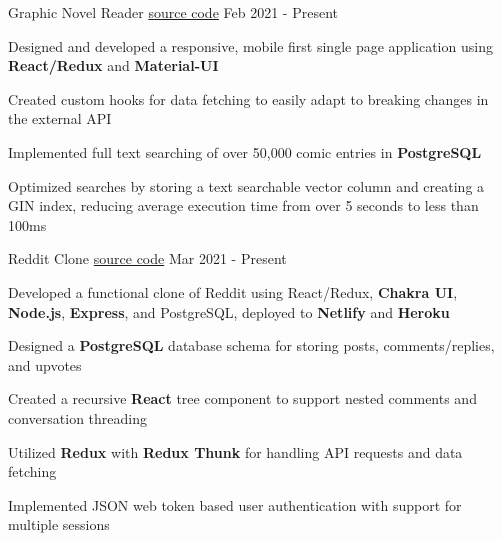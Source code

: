 
\begin{cventries}
  \cventry
    {\fontsize{10pt}{1em}\bodyfont\upshape\color{text}{Front-end comic reading client for the MangaDex API}} %
    {Graphic Novel Reader} %
    {\href{https://github.com/tacticaltofu/mangastack}{source code}} %
    {Feb 2021 - Present} %
    {
      \begin{cvitems} %
        \item {Designed and developed a responsive, mobile first single page application using \textbf{React/Redux} and \textbf{Material-UI}}
        \item {Created custom hooks for data fetching to easily adapt to breaking changes in the external API}
        \item {Implemented full text searching of over 50,000 comic entries in \textbf{PostgreSQL}}
        \item {Optimized searches by storing a text searchable vector column and creating a GIN index, reducing average execution time from over 5 seconds to less than 100ms}
      \end{cvitems}
    }
  \cventry
    {\fontsize{10pt}{1em}\bodyfont\upshape\color{text}{Social news and discussion website very similar to Reddit}} %
    {Reddit Clone} %
    {\href{https://github.com/tacticaltofu/reddit-clone}{source code}} %
    {Mar 2021 - Present} %
    {
      \begin{cvitems} %
        \item {Developed a functional clone of Reddit using React/Redux, \textbf{Chakra UI}, \textbf{Node.js}, \textbf{Express}, and PostgreSQL, deployed to \textbf{Netlify} and \textbf{Heroku}}
        \item {Designed a \textbf{PostgreSQL} database schema for storing posts, comments/replies, and upvotes}
        \item {Created a recursive \textbf{React} tree component to support nested comments and conversation threading}
        \item {Utilized \textbf{Redux} with \textbf{Redux Thunk} for handling API requests and data fetching}
        \item {Implemented JSON web token based user authentication with support for multiple sessions}
      \end{cvitems}
    }
\end{cventries}
